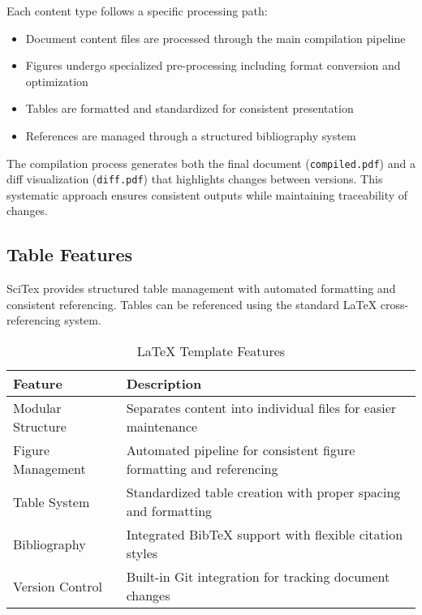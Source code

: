Each content type follows a specific processing path:

\begin{itemize}
    \item Document content files are processed through the main compilation pipeline
    \item Figures undergo specialized pre-processing including format conversion and optimization
    \item Tables are formatted and standardized for consistent presentation
    \item References are managed through a structured bibliography system
\end{itemize}

The compilation process generates both the final document (\verb|compiled.pdf|) and a diff visualization (\verb|diff.pdf|) that highlights changes between versions. This systematic approach ensures consistent outputs while maintaining traceability of changes.

\subsection{Table Features}
\label{subsec:tables}

SciTex provides structured table management with automated formatting and consistent referencing. Tables can be referenced using the standard LaTeX cross-referencing system.


\begin{table}[h!]
\centering
\caption{LaTeX Template Features}
\label{tab:features}
\begin{tabular}{lp{8cm}}
\hline
\textbf{Feature} & \textbf{Description} \\
\hline
Modular Structure & Separates content into individual files for easier maintenance \\
Figure Management & Automated pipeline for consistent figure formatting and referencing \\
Table System & Standardized table creation with proper spacing and formatting \\
Bibliography & Integrated BibTeX support with flexible citation styles \\
Version Control & Built-in Git integration for tracking document changes \\
\hline
\end{tabular}
\end{table}

